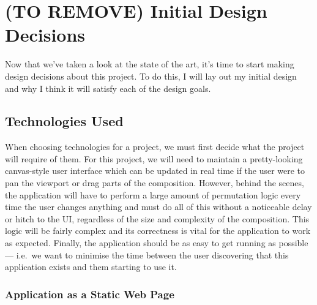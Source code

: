 \documentclass[12pt]{article}
\begin{document}
\pagebreak

\section{(TO REMOVE) Initial Design Decisions}

Now that we've taken a look at the state of the art, it's time to start making design decisions
about this project.  To do this, I will lay out my initial design and why I think it will satisfy
each of the design goals.

\subsection{Technologies Used}

When choosing technologies for a project, we must first decide what the project will require of
them.  For this project, we will need to maintain a pretty-looking canvas-style user interface which
can be updated in real time if the user were to pan the viewport or drag parts of the composition.
However, behind the scenes, the application will have to perform a large amount of permutation logic
every time the user changes anything and must do all of this without a noticeable delay or hitch to
the UI, regardless of the size and complexity of the composition.  This logic will be fairly complex
and its correctness is vital for the application to work as expected.  Finally, the application
should be as easy to get running as possible --- i.e.\ we want to minimise the time between the user
discovering that this application exists and them starting to use it.

\subsubsection{Application as a Static Web Page}
\end{document}
